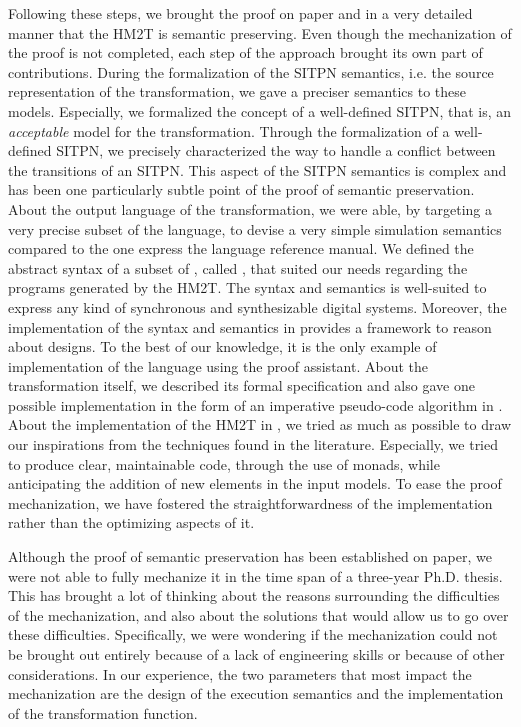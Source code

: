\documentclass[pdflatex,sn-mathphys]{sn-jnl}%
\theoremstyle{thmstyleone}%
\theoremstyle{thmstyletwo}%
\theoremstyle{thmstylethree}%
\begin{document}
Following these steps, we brought the proof on paper and in a very
detailed manner that the HM2T is semantic preserving. Even though the
mechanization of the proof is not completed, each step of the approach
brought its own part of contributions.  During the formalization of
the SITPN semantics, i.e. the source representation of the
transformation, we gave a preciser semantics to these
models. Especially, we formalized the concept of a well-defined SITPN,
that is, an \textit{acceptable} model for the
transformation. %
Through the formalization of a well-defined SITPN, we precisely
characterized the way to handle a conflict between the transitions of
an SITPN. This aspect of the SITPN semantics is complex and has been
one particularly subtle point of the proof of semantic preservation.
About the output language of the transformation, we were able, by
targeting a very precise subset of the \vhdl{} language, to devise a
very simple simulation semantics compared to the one express the
language reference manual. We defined the abstract syntax of a subset
of \vhdl{}, called \hvhdl{}, that suited our needs regarding the
\vhdl{} programs generated by the HM2T. The \hvhdl{} syntax and
semantics is well-suited to express any kind of synchronous and
synthesizable digital systems. Moreover, the implementation of the
\hvhdl{} syntax and semantics in \coq{} provides a framework to reason
about \hvhdl{} designs. To the best of our knowledge, it is the only
example of implementation of the \vhdl{} language using the \coq{}
proof assistant. About the transformation itself, we described its
formal specification and also gave one possible implementation in the
form of an imperative pseudo-code algorithm in
\cite{Iampietro2021}. About the implementation of the HM2T in \coq{},
we tried as much as possible to draw our inspirations from the
techniques found in the literature. Especially, we tried to produce
clear, maintainable code, through the use of monads, while
anticipating the addition of new elements in the input models.  To
ease the proof mechanization, we have fostered the straightforwardness
of the implementation rather than the optimizing aspects of it.

\bigskip


Although the proof of semantic preservation has been established on
paper, we were not able to fully mechanize it in the time span of a
three-year Ph.D. thesis. This has brought a lot of thinking about the
reasons surrounding the difficulties of the mechanization, and also
about the solutions that would allow us to go over these
difficulties. Specifically, we were wondering if the mechanization
could not be brought out entirely because of a lack of engineering
skills or because of other considerations. In our experience, the two
parameters that most impact the mechanization are the design of the
execution semantics and the implementation of the transformation
function.
\end{document}
